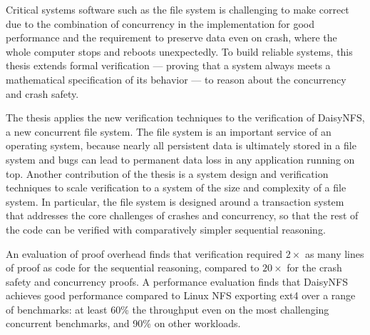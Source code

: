 Critical systems software such as the file system is challenging to make correct
due to the combination of concurrency in the implementation for good performance
and the requirement to preserve data even on crash, where the whole computer
stops and reboots unexpectedly. To build reliable systems, this thesis extends
formal verification --- proving that a system always meets a mathematical
specification of its behavior --- to reason about the concurrency and crash safety.

The thesis applies the new verification techniques to the verification of DaisyNFS, a new
concurrent file system. The file system is an important service of an operating
system, because nearly all persistent data is ultimately stored in a file system
and bugs can lead to permanent data loss in any application running on top.
Another contribution of the thesis is a system design and verification techniques
to scale verification to a system of the size and complexity of a file system.
In particular, the file system is designed around a transaction system that
addresses the core challenges of crashes and concurrency, so that the rest of
the code can be verified with comparatively simpler sequential reasoning.

An evaluation of proof overhead finds that verification required $2\times$ as many lines of proof
as code for the sequential reasoning, compared to $20\times$ for the crash
safety and concurrency proofs. A performance evaluation finds that DaisyNFS achieves good performance compared
to Linux NFS exporting ext4 over a range of benchmarks: at least 60\% the
throughput even on the most challenging concurrent benchmarks, and 90\% on other
workloads.

